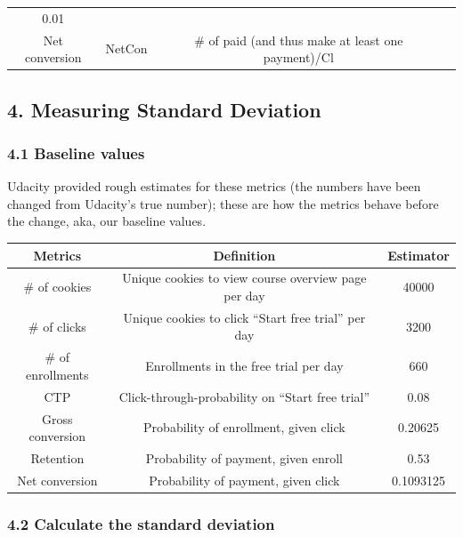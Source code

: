 \documentclass[11pt]{article}
\begin{document}
\begin{longtable}[]{@{}cccc@{}}
\begin{minipage}[t]{0.09\columnwidth}
0.01\strut
\end{minipage}\tabularnewline
\begin{minipage}[t]{0.39\columnwidth}\centering
Net conversion\strut
\end{minipage} & \begin{minipage}[t]{0.18\columnwidth}\centering
NetCon\strut
\end{minipage} & \begin{minipage}[t]{0.23\columnwidth}\centering
\# of paid (and thus make at least one payment)/Cl\strut
\end{minipage} & \begin{minipage}[t]{0.09\columnwidth}\centering
0.0075\strut
\end{minipage}\tabularnewline
\bottomrule
\end{longtable}

    \hypertarget{measuring-standard-deviation}{%
\subsection{4. Measuring Standard
Deviation}\label{measuring-standard-deviation}}

    \hypertarget{baseline-values}{%
\subsubsection{4.1 Baseline values}\label{baseline-values}}

    Udacity provided rough estimates for these metrics (the numbers have
been changed from Udacity's true number); these are how the metrics
behave before the change, aka, our baseline values.

    \begin{longtable}[]{@{}ccc@{}}
\toprule
Metrics & Definition & Estimator\tabularnewline
\midrule
\endhead
\# of cookies & Unique cookies to view course overview page per day &
40000\tabularnewline
\# of clicks & Unique cookies to click ``Start free trial'' per day &
3200\tabularnewline
\# of enrollments & Enrollments in the free trial per day &
660\tabularnewline
CTP & Click-through-probability on ``Start free trial'' &
0.08\tabularnewline
Gross conversion & Probability of enrollment, given click &
0.20625\tabularnewline
Retention & Probability of payment, given enroll & 0.53\tabularnewline
Net conversion & Probability of payment, given click &
0.1093125\tabularnewline
\bottomrule
\end{longtable}

    \hypertarget{calculate-the-standard-deviation}{%
\subsubsection{4.2 Calculate the standard
deviation}\label{calculate-the-standard-deviation}}
\end{document}
